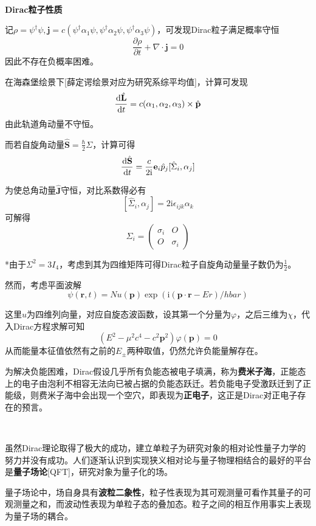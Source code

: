 \documentclass[a4paper,UTF8,fontset=windows]{ctexart}
\newcommand*{\dr}{\hspace{0.07em}\mathrm{d}}
\newcommand*{\ir}{\mathrm{i}}
\newcommand*{\br}{\mathbf{r}}
\newcommand*{\bp}{\mathbf{p}}
\newcommand*{\bj}{\mathbf{J}}
\begin{document}
\

\textbf{Dirac粒子性质}

记$\rho=\psi^\dagger\psi,\mathbf{j}=c(\psi^\dagger\alpha_1\psi,\psi^\dagger\alpha_2\psi,\psi^\dagger\alpha_3\psi)$，可发现Dirac粒子满足概率守恒
$$\frac{\partial\rho}{\partial t}+\nabla\cdot\mathbf{j}=0$$
因此不存在负概率困难。

在海森堡绘景下[薛定谔绘景对应为研究系综平均值]，计算可发现
$$\frac{\dr\hat{\mathbf{L}}}{\dr t}=c(\alpha_1,\alpha_2,\alpha_3)\times\hat{\bp}$$
由此轨道角动量不守恒。

而若自旋角动量$\hat{\mathbf{S}}=\frac{\hbar}{2}\Sigma$，计算可得
$$\frac{\dr\hat{\mathbf{S}}}{\dr t}=\frac{c}{2\ir}\mathbf{e}_i\hat{p}_j[\hat{\Sigma}_i,\alpha_j]$$

为使总角动量$\hat{\bj}$守恒，对比系数得必有
$$[\hat{\Sigma}_i,\alpha_j]=2\ir\epsilon_{ijk}\alpha_k$$
可解得
$$\Sigma_i=\begin{pmatrix}\sigma_i&O\\O&\sigma_i\end{pmatrix}$$

*由于$\Sigma^2=3I_4$，考虑到其为四维矩阵可得Dirac粒子自旋角动量量子数仍为$\frac{1}{2}$。

然而，考虑平面波解
$$\psi(\br,t)=Nu(\bp)\exp(\ir(\bp\cdot\br-Er)/hbar)$$

这里$u$为四维列向量，对应自旋态波函数，设其第一个分量为$\varphi$，之后三维为$\chi$，代入Dirac方程求解可知
$$(E^2-\mu^2c^4-c^2\bp^2)\varphi(\bp)=0$$
从而能量本征值依然有之前的$E_\pm$两种取值，仍然允许负能量解存在。

为解决负能困难，Dirac假设几乎所有负能态被电子填满，称为\textbf{费米子海}，正能态上的电子由泡利不相容无法向已被占据的负能态跃迁。若负能电子受激跃迁到了正能级，则费米子海中会出现一个空穴，即表现为\textbf{正电子}，这正是Dirac对正电子存在的预言。

\

虽然Dirac理论取得了极大的成功，建立单粒子为研究对象的相对论性量子力学的努力并没有成功。人们逐渐认识到实现狭义相对论与量子物理相结合的最好的平台是\textbf{量子场论}[QFT]，研究对象为量子化的场。

量子场论中，场自身具有\textbf{波粒二象性}，粒子性表现为其可观测量可看作其量子的可观测量之和，而波动性表现为单粒子态的叠加态。粒子之间的相互作用事实上表现为量子场的耦合。
\end{document}
